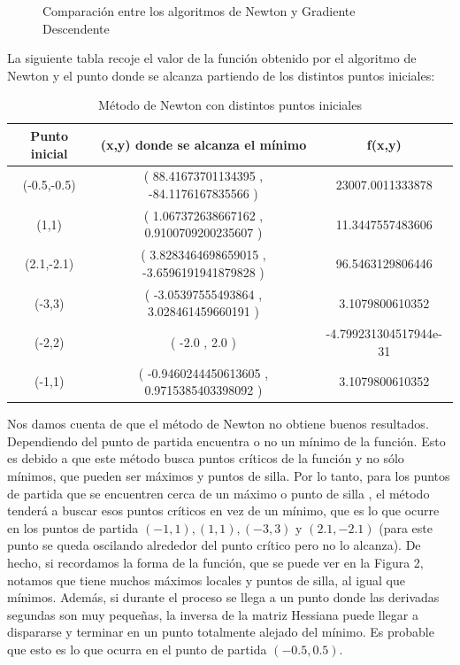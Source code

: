 \documentclass[a4]{article}
\begin{document}
\begin{figure}[H]
	\caption{Comparación entre los algoritmos de Newton y Gradiente Descendente}
	\label{fig:new}
\end{figure}

La siguiente tabla recoje el valor de la función obtenido por el algoritmo de Newton y el punto donde se alcanza partiendo de los distintos puntos iniciales: 

\begin{table}[htbp]
	\centering
	\caption{Método de Newton con distintos puntos iniciales}
	\begin{tabular}{|c|c|c|}
		\hline
		\textbf{Punto inicial } & \textbf{(x,y) donde se alcanza el mínimo} & \textbf{f(x,y)} \\ \hline
		(-0.5,-0.5) & ( 88.41673701134395 , -84.1176167835566 ) & 23007.0011333878 \\ \hline
		(1,1) & ( 1.067372638667162 , 0.9100709200235607 ) & 11.3447557483606 \\ \hline
		(2.1,-2.1) & ( 3.8283464698659015 , -3.6596191941879828 ) & 96.5463129806446 \\ \hline
		(-3,3) & ( -3.05397555493864 , 3.028461459660191 ) & 3.1079800610352 \\ \hline
		(-2,2) &  ( -2.0 , 2.0 ) & -4.799231304517944e-31{\tiny } \\ \hline
		(-1,1) & ( -0.9460244450613605 , 0.9715385403398092 ) & 3.1079800610352 \\ \hline
	\end{tabular}
	\label{}
\end{table}



Nos damos cuenta de que el método de Newton no obtiene buenos resultados. Dependiendo del punto de partida encuentra o no un mínimo de la función. Esto es debido a que este método busca puntos críticos de la función y no sólo mínimos, que pueden ser máximos y puntos de silla. Por lo tanto, para los puntos de partida que se encuentren cerca de un máximo o punto de silla , el método tenderá a buscar esos puntos críticos en vez de un mínimo, que es lo que ocurre en los puntos de partida $(-1,1),(1,1),(-3,3)$ y $(2.1,-2.1)$ (para este punto se queda oscilando alrededor del punto crítico pero no lo alcanza). De hecho, si recordamos la forma de la función, que se puede ver en la Figura 2, notamos que tiene muchos máximos locales y puntos de silla, al igual que mínimos. Además, si durante el proceso se llega a un punto donde las derivadas segundas son muy pequeñas, la inversa de la matriz Hessiana puede llegar a dispararse y terminar en un punto totalmente alejado del mínimo. Es probable que esto es lo que ocurra  en el punto de partida $(-0.5,0.5)$. 
\end{document}
